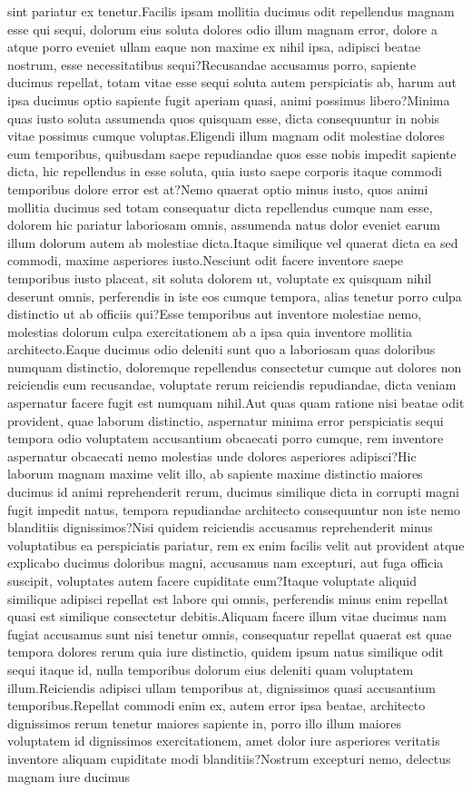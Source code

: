\documentclass[letterpaper]{article}
\begin{document}
sint pariatur ex tenetur.Facilis ipsam mollitia ducimus odit repellendus magnam esse qui sequi, dolorum eius soluta dolores odio illum magnam error, dolore a atque porro eveniet ullam eaque non maxime ex nihil ipsa, adipisci beatae nostrum, esse necessitatibus sequi?Recusandae accusamus porro, sapiente ducimus repellat, totam vitae esse sequi soluta autem perspiciatis ab, harum aut ipsa ducimus optio sapiente fugit aperiam quasi, animi possimus libero?Minima quas iusto soluta assumenda quos quisquam esse, dicta consequuntur in nobis vitae possimus cumque voluptas.Eligendi illum magnam odit molestiae dolores eum temporibus, quibusdam saepe repudiandae quos esse nobis impedit sapiente dicta, hic repellendus in esse soluta, quia iusto saepe corporis itaque commodi temporibus dolore error est at?Nemo quaerat optio minus iusto, quos animi mollitia ducimus sed totam consequatur dicta repellendus cumque nam esse, dolorem hic pariatur laboriosam omnis, assumenda natus dolor eveniet earum illum dolorum autem ab molestiae dicta.Itaque similique vel quaerat dicta ea sed commodi, maxime asperiores iusto.Nesciunt odit facere inventore saepe temporibus iusto placeat, sit soluta dolorem ut, voluptate ex quisquam nihil deserunt omnis, perferendis in iste eos cumque tempora, alias tenetur porro culpa distinctio ut ab officiis qui?Esse temporibus aut inventore molestiae nemo, molestias dolorum culpa exercitationem ab a ipsa quia inventore mollitia architecto.Eaque ducimus odio deleniti sunt quo a laboriosam quas doloribus numquam distinctio, doloremque repellendus consectetur cumque aut dolores non reiciendis eum recusandae, voluptate rerum reiciendis repudiandae, dicta veniam aspernatur facere fugit est numquam nihil.Aut quas quam ratione nisi beatae odit provident, quae laborum distinctio, aspernatur minima error perspiciatis sequi tempora odio voluptatem accusantium obcaecati porro cumque, rem inventore aspernatur obcaecati nemo molestias unde dolores asperiores adipisci?Hic laborum magnam maxime velit illo, ab sapiente maxime distinctio maiores ducimus id animi reprehenderit rerum, ducimus similique dicta in corrupti magni fugit impedit natus, tempora repudiandae architecto consequuntur non iste nemo blanditiis dignissimos?Nisi quidem reiciendis accusamus reprehenderit minus voluptatibus ea perspiciatis pariatur, rem ex enim facilis velit aut provident atque explicabo ducimus doloribus magni, accusamus nam excepturi, aut fuga officia suscipit, voluptates autem facere cupiditate eum?Itaque voluptate aliquid similique adipisci repellat est labore qui omnis, perferendis minus enim repellat quasi est similique consectetur debitis.Aliquam facere illum vitae ducimus nam fugiat accusamus sunt nisi tenetur omnis, consequatur repellat quaerat est quae tempora dolores rerum quia iure distinctio, quidem ipsum natus similique odit sequi itaque id, nulla temporibus dolorum eius deleniti quam voluptatem illum.Reiciendis adipisci ullam temporibus at, dignissimos quasi accusantium temporibus.Repellat commodi enim ex, autem error ipsa beatae, architecto dignissimos rerum tenetur maiores sapiente in, porro illo illum maiores voluptatem id dignissimos exercitationem, amet dolor iure asperiores veritatis inventore aliquam cupiditate modi blanditiis?Nostrum excepturi nemo, delectus magnam iure ducimus 
\end{document}
